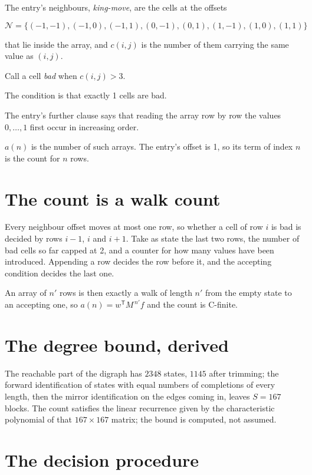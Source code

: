 \documentclass[11pt]{article}
\theoremstyle{definition}
\begin{document}
The entry's neighbours, {\itshape king-move}, are the cells at the offsets

\[\mathcal{N} = \{(-1,-1), (-1,0), (-1,1), (0,-1), (0,1), (1,-1), (1,0), (1,1)\}\]

that lie inside the array, and $c(i,j)$ is the number of them carrying the same value as $(i,j)$.

Call a cell {\itshape bad} when $c(i,j) > 3$.

The condition is that exactly 1 cells are bad.

The entry's further clause says that reading the array row by row the values $0,\dots,1$ first occur in increasing order.

$a(n)$ is the number of such arrays. The entry's offset is 1, so its term of index $n$ is the count for $n$ rows.

\section{The count is a walk count}

Every neighbour offset moves at most one row, so whether a cell of row $i$ is bad is decided by rows $i-1$, $i$ and $i+1$. Take as state the last two rows, the number of bad cells so far capped at 2, and a counter for how many values have been introduced. Appending a row decides the row before it, and the accepting condition decides the last one.

An array of $n'$ rows is then exactly a walk of length $n'$ from the empty state to an accepting one, so $a(n) = w^{\mathsf T}M^{\,n'}f$ and the count is C-finite.

\section{The degree bound, derived}

The reachable part of the digraph has $2348$ states, $1145$ after trimming; the forward identification of states with equal numbers of completions of every length, then the mirror identification on the edges coming in, leaves $S = 167$ blocks. The count satisfies the linear recurrence given by the characteristic polynomial of that $167\times167$ matrix; the bound is computed, not assumed.

\section{The decision procedure}
\end{document}
